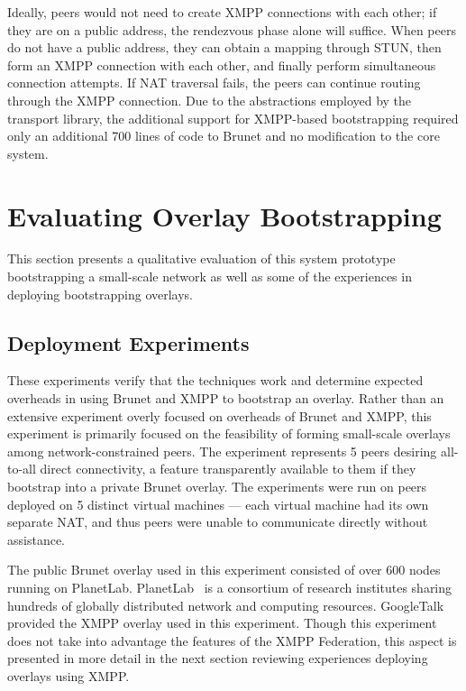 Ideally, peers would not need to create XMPP connections with each other; if
they are on a public address, the rendezvous phase alone will suffice.  When
peers do not have a public address, they can obtain a mapping through STUN,
then form an XMPP connection with each other, and finally perform simultaneous
connection attempts.  If NAT traversal fails, the peers can continue routing
through the XMPP connection.  Due to the abstractions employed by the transport
library, the additional support for XMPP-based bootstrapping required only an
additional 700 lines of code to Brunet and no modification to the core system.

\section{Evaluating Overlay Bootstrapping}
\label{bs:evaluations}

This section presents a qualitative evaluation of this system prototype
bootstrapping a small-scale network as well as some of the experiences in
deploying bootstrapping overlays.

\subsection{Deployment Experiments}

These experiments verify that the techniques work and determine expected
overheads in using Brunet and XMPP to bootstrap an overlay.  Rather than an
extensive experiment overly focused on overheads of Brunet and XMPP, this
experiment is primarily focused on the feasibility of forming small-scale
overlays among network-constrained peers.  The experiment represents 5 peers
desiring all-to-all direct connectivity, a feature transparently available to
them if they bootstrap into a private Brunet overlay. The experiments were run
on peers deployed on 5 distinct virtual machines --- each virtual machine had
its own separate NAT, and thus peers were unable to communicate directly
without assistance.

The public Brunet overlay used in this experiment consisted of over 600 nodes
running on PlanetLab.  PlanetLab~\cite{planetlab} is a consortium of research
institutes sharing hundreds of globally distributed network and computing
resources.  GoogleTalk provided the XMPP overlay used in this experiment.
Though this experiment does not take into advantage the features of the XMPP
Federation, this aspect is presented in more detail in the next section
reviewing experiences deploying overlays using XMPP.

